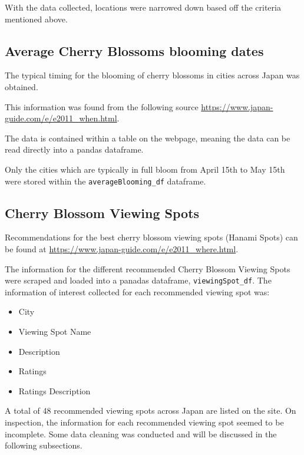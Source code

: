 \documentclass[11pt]{article}
\providecommand{\tightlist}{%
      \setlength{\itemsep}{0pt}\setlength{\parskip}{0pt}}
\begin{document}
With the data collected, locations  were narrowed down based off the criteria mentioned above.

    \hypertarget{average-cherry-blossoms-blooming-dates}{%
\subsection{Average Cherry Blossoms blooming
dates}\label{average-cherry-blossoms-blooming-dates}}

The typical timing for the blooming of cherry blossoms in cities across Japan was obtained.

This information was found from the following source \url{https://www.japan-guide.com/e/e2011_when.html}.

The data is contained within a table on the webpage, meaning the data can be read directly into a pandas dataframe.

Only the cities which are typically in full bloom from April 15th to May
15th were stored within the \texttt{averageBlooming\_df} dataframe.



    \hypertarget{cherry-blossom-viewing-spots}{%
\subsection{Cherry Blossom Viewing
Spots}\label{cherry-blossom-viewing-spots}}

Recommendations for the best cherry blossom viewing spots (Hanami Spots) can be found at \url{https://www.japan-guide.com/e/e2011_where.html}.

The information for the different recommended Cherry Blossom Viewing Spots were scraped and loaded into a panadas dataframe, \texttt{viewingSpot\_df}.
The information of interest collected for each recommended viewing spot was:

\begin{itemize}
\tightlist
  \item City
  \item Viewing Spot Name
  \item Description
  \item Ratings
  \item Ratings Description
\end{itemize}

A total  of 48 recommended viewing spots across Japan are listed on the site. On inspection, the information for each recommended viewing spot 
seemed to be incomplete. Some data cleaning was conducted and will be discussed in the following subsections.
\end{document}
